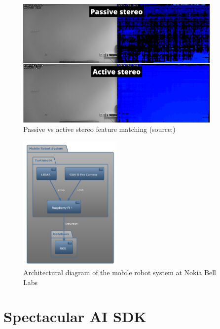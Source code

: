 \begin{figure}[htbp]
    \centering
    \includegraphics[width=100mm, keepaspectratio]{figures/active-vs-passive-stereo.png}
    \caption{Passive vs active stereo feature matching (source:\cite{ActivePassiveStereo})}
    \label{fig:active-passive-stereo}
\end{figure}

\begin{figure}[htbp]
    \centering
    \includegraphics[width=50mm, keepaspectratio]{figures/turtlebot4_architecture.png}
    \caption{Architectural diagram of the mobile robot system at Nokia Bell Labs}
    \label{fig:mobile_robot_architecture}
\end{figure}

\FloatBarrier
\section{Spectacular AI SDK}

